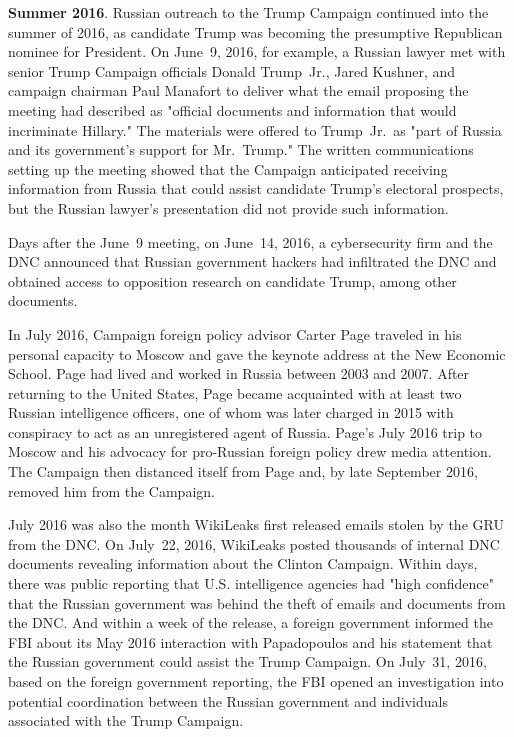 \textbf{Summer 2016}.
Russian outreach to the Trump Campaign continued into the summer of 2016, as candidate Trump was becoming the presumptive Republican nominee for President.
On June~9, 2016, for example, a Russian lawyer met with senior Trump Campaign officials Donald Trump~Jr., Jared Kushner, and campaign chairman Paul Manafort to deliver what the email proposing the meeting had described as "official documents and information that would incriminate Hillary."
The materials were offered to Trump~Jr.\ as "part of Russia and its government's support for Mr.~Trump."
The written communications setting up the meeting showed that the Campaign anticipated receiving information from Russia that could assist candidate Trump's electoral prospects, but the Russian lawyer's presentation did not provide such information.

Days after the June~9 meeting, on June~14, 2016, a cybersecurity firm and the DNC announced that Russian government hackers had infiltrated the DNC and obtained access to opposition research on candidate Trump, among other documents.

In July 2016, Campaign foreign policy advisor Carter Page traveled in his personal capacity to Moscow and gave the keynote address at the New Economic School.
Page had lived and worked in Russia between 2003 and 2007.
After returning to the United States, Page became acquainted with at least two Russian intelligence officers, one of whom was later charged in 2015 with conspiracy to act as an unregistered agent of Russia.
Page's July 2016 trip to Moscow and his advocacy for pro-Russian foreign policy drew media attention.
The Campaign then distanced itself from Page and, by late September 2016, removed him from the Campaign.

July 2016 was also the month WikiLeaks first released emails stolen by the GRU from the DNC\null.
On July~22, 2016, WikiLeaks posted thousands of internal DNC documents revealing information about the Clinton Campaign.
Within days, there was public reporting that U.S. intelligence agencies had "high confidence" that the Russian government was behind the theft of emails and documents from the DNC\null.
And within a week of the release, a foreign government informed the FBI about its May 2016 interaction with Papadopoulos and his statement that the Russian government could assist the Trump Campaign.
On July~31, 2016, based on the foreign government reporting, the FBI opened an investigation into potential coordination between the Russian government and individuals associated with the Trump Campaign.

